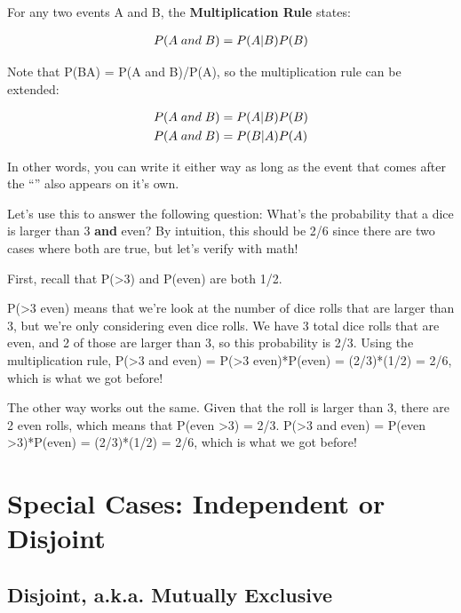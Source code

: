 \documentclass[
  letterpaper,
  DIV=11,
  numbers=noendperiod]{scrreprt}
\begin{document}
For any two events A and B, the \textbf{Multiplication Rule} states:

\begin{align*}
\small P(A\; and\; B) = P(A|B)P(B)
\end{align*}

Note that P(B\textbar A) = P(A and B)/P(A), so the multiplication rule
can be extended:

\begin{align*}
\small P(A\; and\; B) &\small = P(A|B)P(B)\\
\small P(A\; and\; B) &\small = P(B|A)P(A)
\end{align*}

In other words, you can write it either way as long as the event that
comes after the ``\textbar{}'' also appears on it's own.

Let's use this to answer the following question: What's the probability
that a dice is larger than 3 \textbf{and} even? By intuition, this
should be 2/6 since there are two cases where both are true, but let's
verify with math!

First, recall that P(\textgreater3) and P(even) are both 1/2.

P(\textgreater3 \textbar{} even) means that we're look at the number of
dice rolls that are larger than 3, but we're only considering even dice
rolls. We have 3 total dice rolls that are even, and 2 of those are
larger than 3, so this probability is 2/3. Using the multiplication
rule, P(\textgreater3 and even) = P(\textgreater3 \textbar{}
even)*P(even) = (2/3)*(1/2) = 2/6, which is what we got before!

The other way works out the same. Given that the roll is larger than 3,
there are 2 even rolls, which means that P(even \textbar{}
\textgreater3) = 2/3. P(\textgreater3 and even) = P(even \textbar{}
\textgreater3)*P(even) = (2/3)*(1/2) = 2/6, which is what we got before!

\hypertarget{special-cases-independent-or-disjoint}{%
\section{Special Cases: Independent or
Disjoint}\label{special-cases-independent-or-disjoint}}

\hypertarget{disjoint-a.k.a.-mutually-exclusive}{%
\subsection{Disjoint, a.k.a. Mutually
Exclusive}\label{disjoint-a.k.a.-mutually-exclusive}}
\end{document}

